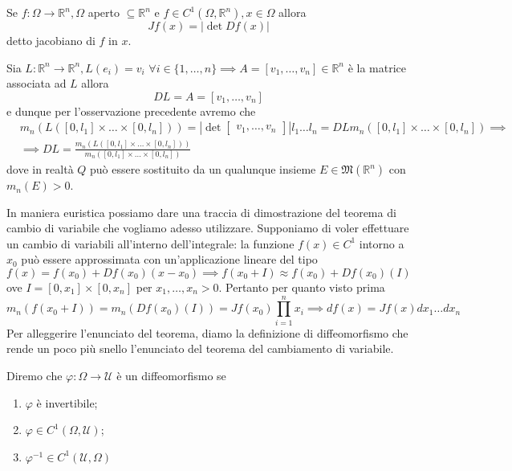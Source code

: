 %
\vspace{0.5cm}
\begin{definition}[\textcolor{blue}{jacobiano}]
	Se $f: \Omega \to \mathbb{R}^n, \Omega$ aperto $\subseteq \mathbb{R}^n$ e $f \in C^1(\Omega, \mathbb{R}^n), x \in \Omega$ allora
	$$
	Jf(x) = |\det{Df(x)}|
	$$
	detto jacobiano di $f$ in $x$.
\end{definition}
%
\begin{remark}
	Sia $L: \mathbb{R}^n \to \mathbb{R}^n, L(e_i) = v_i \, \, \forall i \in \{1, \ldots, n \} \implies A = [v_1, \ldots, v_n] \in \mathbb{R}^n$ è la matrice associata ad $L$ allora
	$$
	DL = A = [v_1, \ldots, v_n]
	$$
	e dunque per l'osservazione precedente avremo che
	\[\begin{aligned}
	&m_n (L([0, l_1] \times \ldots \times [0, l_n])) = \left| \det \begin{bmatrix} v_1, \ldots, v_n \end{bmatrix} \right| l_1 \ldots l_n = DL m_n([0, l_1] \times \ldots \times [0, l_n]) \implies \\ 
	&\implies DL = \frac{m_n(L([0, l_1] \times \ldots \times [0, l_n]))}{m_n([0, l_1] \times \ldots \times [0, l_n])}
	\end{aligned}\]
	dove in realtà $Q$ può essere sostituito da un qualunque insieme $E \in \mathfrak{M}(\mathbb{R}^n)$ con $m_n(E) > 0$.
\end{remark}
%
In maniera euristica possiamo dare una traccia di dimostrazione del teorema di cambio di variabile che vogliamo adesso utilizzare. Supponiamo di voler effettuare un cambio di variabili all'interno dell'integrale: la funzione $f(x) \in C^1$ intorno a $x_0$ può
essere approssimata con un'applicazione lineare del tipo
$$
f(x) = f(x_0) + Df(x_0)(x-x_0) \implies f(x_0 + I) \approx f(x_0) + Df(x_0)(I)
$$
ove $I=[0, x_1] \times [0, x_n]$ per $x_1, \ldots, x_n > 0$. Pertanto per quanto visto prima
$$
m_n(f(x_0 + I)) = m_n(Df(x_0)(I)) = Jf(x_0) \prod_{i=1}^n x_i \implies df(x) = Jf(x) dx_1 \ldots dx_n
$$
Per alleggerire l'enunciato del teorema, diamo la definizione di diffeomorfismo che rende un poco più snello l'enunciato del teorema del cambiamento di variabile.
%
\vspace{0.5cm}
\begin{definition}[\textcolor{blue}{diffeomorfismo}]
	Diremo che $\varphi: \Omega \to \mathcal{U}$ è un diffeomorfismo se 
	\begin{enumerate}[label=\protect\circled{\arabic*}]
		\item $\varphi$ è invertibile; 
		\item $\varphi \in C^1(\Omega, \mathcal{U})$;
		\item $\varphi^{-1} \in C^1(\mathcal{U}, \Omega)$
	\end{enumerate}
\end{definition}
